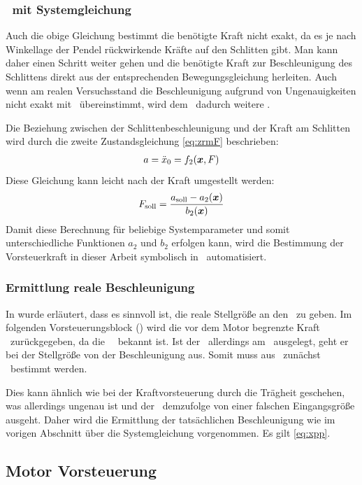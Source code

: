 \subsubsection{\vorst\  mit Systemgleichung}
Auch die obige Gleichung bestimmt die benötigte Kraft nicht exakt, da es je nach Winkellage der Pendel rückwirkende Kräfte auf den Schlitten gibt.
Man kann daher einen Schritt weiter gehen und die benötigte Kraft zur Beschleunigung des Schlittens direkt aus der entsprechenden Bewegungsgleichung herleiten. 
Auch wenn am realen Versuchsstand die Beschleunigung aufgrund von Ungenauigkeiten nicht exakt mit \asoll\ übereinstimmt, wird dem \avr\ dadurch weitere .

Die Beziehung zwischen der Schlittenbeschleunigung und der Kraft am Schlitten wird durch die zweite Zustandsgleichung \eqref{eq:zrmF} beschrieben:
\begin{align}
	a=\ddot{x}_0=f_2(\boldsymbol{x},F)
	\label{eq:xpp}
\end{align}
Diese Gleichung kann leicht nach der Kraft umgestellt werden:
\begin{align}
	F_{\mathrm{soll}}=\frac{a_{\mathrm{soll}}-a_2(\boldsymbol{x})}{b_2(\boldsymbol{x})}
\end{align}
Damit diese Berechnung für beliebige Systemparameter und somit unterschiedliche Funktionen $a_2$ und $b_2$ erfolgen kann, wird die Bestimmung der Vorsteuerkraft in dieser Arbeit symbolisch in \ml\ automatisiert.

\subsubsection{Ermittlung reale Beschleunigung}
In  wurde erläutert, dass es sinnvoll ist, die reale Stellgröße an den \beob\ zu geben.
Im folgenden Vorsteuerungsblock () wird die vor dem Motor begrenzte Kraft \freal\ zurückgegeben, da die \sgb\ \fmax\ bekannt ist.
Ist der \beob\ allerdings am \bss\ ausgelegt, geht er bei der Stellgröße von der Beschleunigung aus.
Somit muss aus \freal\ zunächst \areal\ bestimmt werden.

Dies kann ähnlich wie bei der Kraftvorsteuerung durch die Trägheit geschehen, was allerdings ungenau ist und der \beob\ demzufolge von einer falschen Eingangsgröße ausgeht.
Daher wird die Ermittlung der tatsächlichen Beschleunigung wie im vorigen Abschnitt über die Systemgleichung vorgenommen.
Es gilt \eqref{eq:xpp}.



\subsection{Motor Vorsteuerung}\label{sec:motvorst}






